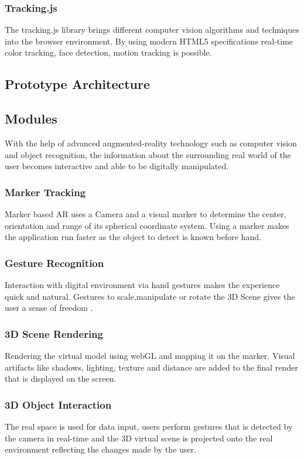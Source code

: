 \documentclass[conference]{IEEEtran}
\begin{document}
\subsubsection{Tracking.js} The tracking.js library brings different computer vision algorithms and techniques into the browser environment. By using modern HTML5 specifications real-time color tracking, face detection, motion tracking is possible.
\subsection{Prototype Architecture}

\subsection{Modules}
With the help of advanced augmented-reality technology such as computer vision and object recognition, the information about the surrounding real world of the user becomes interactive and able to be digitally manipulated. 
\subsubsection{Marker Tracking}
Marker based AR uses a Camera and a visual marker to determine the center, orientation and range of its spherical coordinate system. Using a marker makes the application run faster as the object to detect is known before hand.
\subsubsection{Gesture Recognition}
Interaction with digital environment via hand gestures makes the experience quick and natural. Gestures to scale,manipulate or rotate the 3D Scene gives the user a sense of freedom .
\subsubsection{3D Scene Rendering}
Rendering the virtual model using webGL and mapping it on the marker. Visual artifacts like shadows, lighting, texture and distance are added to the final render that is displayed on the screen.
\subsubsection{3D Object Interaction}
The real space is used for data input, users perform gestures that is detected by the camera in real-time and the 3D virtual scene is projected onto the real environment reflecting the changes made by the user.
\end{document}
